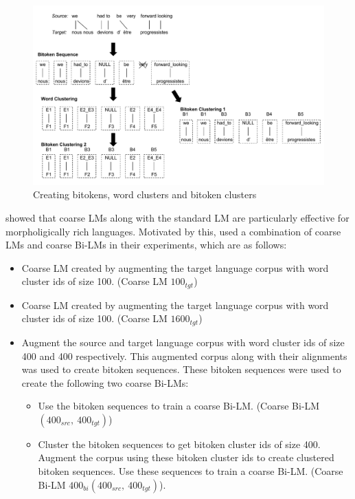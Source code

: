 \begin{figure}[htbp]
	\begin{center}
		\includegraphics[width=15cm]{files/images/bitoken-example3}
	\end{center}
	\caption{Creating bitokens, word clusters and bitoken clusters \cite{Stewart2014}}
	\label{fig:bitokens-clusters}
\end{figure}

\cite{Ammar2013,Bisazza2014} showed that coarse LMs along with the standard LM are particularly effective for morpholigically rich languages. Motivated by this, \cite{Stewart2014} used a combination of coarse LMs and coarse Bi-LMs in their experiments, which are as follows:
\begin{itemize}
	\item Coarse LM created by augmenting the target language corpus with word cluster ids of size 100. (Coarse LM $100_{tgt}$)
	\item Coarse LM created by augmenting the target language corpus with word cluster ids of size 100. (Coarse LM $1600_{tgt}$)
	\item Augment the source and target language corpus with word cluster ids of size 400 and 400 respectively. This augmented corpus along with their alignments was used to create bitoken sequences. These bitoken sequences were used to create the following two coarse Bi-LMs:
	\begin{itemize}
		\item Use the bitoken sequences to train a coarse Bi-LM. (Coarse Bi-LM $(400_{src},\ 400_{tgt})$)
		\item Cluster the bitoken sequences to get bitoken cluster ids of size 400. Augment the corpus using these bitoken cluster ids to create clustered bitoken sequences. Use these sequences to train a coarse Bi-LM. (Coarse Bi-LM $400_{bi}(400_{src},\ 400_{tgt})$).
	\end{itemize}
\end{itemize}

